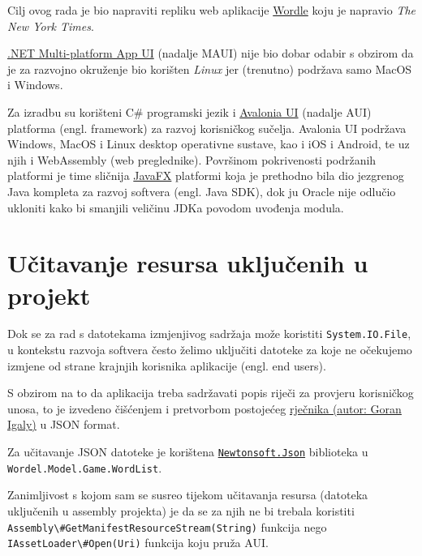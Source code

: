 \documentclass[12pt,a4paper]{report}
\begin{document}
\par
Cilj ovog rada je bio napraviti repliku web aplikacije
\href{https://www.nytimes.com/games/wordle/index.html}{Wordle} koju je
napravio \emph{The New York Times}.

\par
\href{https://dotnet.microsoft.com/en-us/apps/maui}{.NET Multi-platform
App UI} (nadalje MAUI) nije bio dobar odabir s obzirom da je za razvojno
okruženje bio korišten \emph{Linux} jer (trenutno) podržava samo MacOS i
Windows.

\par
Za izradbu su korišteni C\# programski jezik i
\href{https://avaloniaui.net/}{Avalonia UI} (nadalje AUI) platforma
(engl. framework) za razvoj korisničkog sučelja. Avalonia UI podržava
Windows, MacOS i Linux desktop operativne sustave, kao i iOS i Android,
te uz njih i WebAssembly (web preglednike). Površinom pokrivenosti
podržanih platformi je time sličnija \href{https://openjfx.io/}{JavaFX}
platformi koja je prethodno bila dio jezgrenog Java kompleta za razvoj
softvera (engl. Java SDK), dok ju Oracle nije odlučio ukloniti kako bi
smanjili veličinu JDKa povodom uvođenja modula.

\par
\hypertarget{ucitavanje-resursa-ukljucenih-u-projekt}{%
\chapter{Učitavanje resursa uključenih u
projekt}\label{ucitavanje-resursa-ukljucenih-u-projekt}}

\par
Dok se za rad s datotekama izmjenjivog sadržaja može koristiti
\verb|System.IO.File|, u kontekstu razvoja softvera često želimo
uključiti datoteke za koje ne očekujemo izmjene od strane krajnjih
korisnika aplikacije (engl. end users).

\par
S obzirom na to da aplikacija treba sadržavati popis riječi za provjeru
korisničkog unosa, to je izvedeno čišćenjem i pretvorbom postojećeg
\href{https://github.com/gigaly/rjecnik-hrvatskih-jezika}{rječnika
(autor: Goran Igaly)} u JSON format.

\par
Za učitavanje JSON datoteke je korištena
\href{https://www.newtonsoft.com/json}{\texttt{Newtonsoft.Json}}
biblioteka u \linebreak \verb|Wordel.Model.Game.WordList|.

\par
Zanimljivost s kojom sam se susreo tijekom učitavanja resursa (datoteka
uključenih u assembly projekta) je da se za njih ne bi trebala koristiti\linebreak
\verb|Assembly\#GetManifestResourceStream(String)| funkcija nego\linebreak
\verb|IAssetLoader\#Open(Uri)| funkcija koju pruža AUI.
\end{document}
